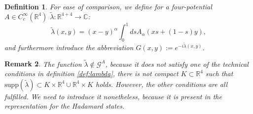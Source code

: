 \documentclass[b5paper,draft,openbib,12pt]{memoir}
\newtheorem{Def}{Definition}
\newtheorem{Remark}[Def]{Remark}
\begin{document}
\begin{Def}
For ease of comparison, we define for a four-potential \(A\in C_c^\infty(\mathbb{R}^4)\)
\(\tilde{\lambda}:\mathbb{R}^{4+4}\rightarrow \mathbb{C}\):
\begin{equation}
\tilde{\lambda}(x,y)= (x-y)^\alpha\int_0^1 ds A_\alpha (x s + (1-s)y),
\end{equation}
and furthermore introduce the abbreviation \(G(x,y):=e^{-i \tilde{\lambda}(x,y)} \).
\end{Def}

\begin{Remark}
The function \(\tilde{\lambda}\not\in \mathcal{G}^A\), because it does not satisfy one of the technical conditions in definition
\ref{def:lambda}, there is not compact \(K\subset\mathbb{R}^4\) such that 
\(\mathrm{supp}(\tilde{\lambda})\subset K\times \mathbb{R}^4 \cup \mathbb{R}^4\times K\) holds. However, the other conditions are all fulfilled. 
We need to introduce it nonetheless, because it is present in the representation for the Hadamard states.
\end{Remark}
\end{document}
